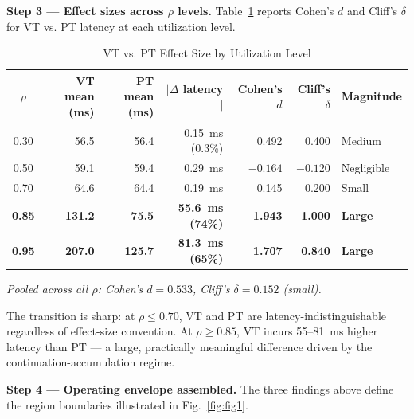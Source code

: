 \documentclass[10pt]{article}
\newenvironment{caveat}{\small\itshape}{\par}
\begin{document}
\textbf{Step 3 --- Effect sizes across $\rho$ levels.} Table~\ref{tab:effectsize} reports Cohen's $d$ and Cliff's $\delta$ for VT vs. PT latency at each utilization level.

\begin{table}[t]
\centering
\caption{VT vs. PT Effect Size by Utilization Level}
\label{tab:effectsize}
\begin{tabular}{@{}crrrrrl@{}}
\toprule
\textbf{$\rho$} & \textbf{VT mean (ms)} & \textbf{PT mean (ms)} & \textbf{$|\Delta$ latency$|$} & \textbf{Cohen's $d$} & \textbf{Cliff's $\delta$} & \textbf{Magnitude} \\
\midrule
0.30 & 56.5 & 56.4 & 0.15~ms (0.3\%) & 0.492 & 0.400 & Medium\footnotemark[1] \\
0.50 & 59.1 & 59.4 & 0.29~ms & $-0.164$ & $-0.120$ & Negligible \\
0.70 & 64.6 & 64.4 & 0.19~ms & 0.145 & 0.200 & Small \\
\textbf{0.85} & \textbf{131.2} & \textbf{75.5} & \textbf{55.6~ms (74\%)} & \textbf{1.943} & \textbf{1.000} & \textbf{Large} \\
\textbf{0.95} & \textbf{207.0} & \textbf{125.7} & \textbf{81.3~ms (65\%)} & \textbf{1.707} & \textbf{0.840} & \textbf{Large} \\
\bottomrule
\end{tabular}
\end{table}

\begin{caveat}
Pooled across all $\rho$: Cohen's $d = 0.533$, Cliff's $\delta = 0.152$ (small).
\end{caveat}

The transition is sharp: at $\rho \leq 0.70$, VT and PT are latency-indistinguishable regardless of effect-size convention. At $\rho \geq 0.85$, VT incurs 55--81~ms higher latency than PT --- a large, practically meaningful difference driven by the continuation-accumulation regime.

\textbf{Step 4 --- Operating envelope assembled.} The three findings above define the region boundaries illustrated in Fig.~\ref{fig:fig1}.
\end{document}
